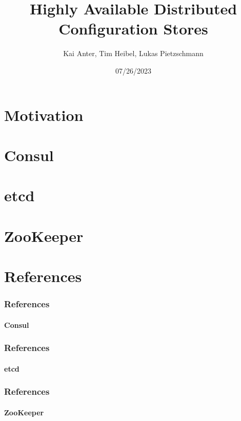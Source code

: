 \documentclass[aspectratio=169, usepdftitle=false]{beamer}
\title[Highly Available Distributed Config Stores]{Highly Available Distributed Configuration Stores}
\author[Kai, Tim, Lukas]{Kai Anter, Tim Heibel, Lukas Pietzschmann}
\subtitle{}
\institute{Institute of Distributed Systems}
\date{07/26/2023}
\begin{document}
\maketitle

\section{Motivation}


\section{Consul}


\section{etcd}


\section{ZooKeeper}


\section{References}
\begin{frame}[allowframebreaks]
	\frametitle{References}
	\framesubtitle{Consul}
	\printbibliography[keyword={kai}]
\end{frame}
\begin{frame}[allowframebreaks]
	\frametitle{References}
	\framesubtitle{etcd}
	\printbibliography[keyword={tim}]
\end{frame}
\begin{frame}[allowframebreaks]
	\frametitle{References}
	\framesubtitle{ZooKeeper}
	\printbibliography[keyword={lukas}]
\end{frame}
\end{document}
